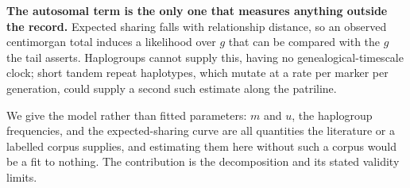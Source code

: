 \documentclass[11pt]{article}
\begin{document}
\noindent\textbf{The autosomal term is the only one that measures anything outside the record.}
Expected sharing falls with relationship distance, so an observed centimorgan total induces a
likelihood over $g$ that can be compared with the $g$ the tail asserts. Haplogroups cannot supply this,
having no genealogical-timescale clock; short tandem repeat haplotypes, which mutate at a rate per
marker per generation, could supply a second such estimate along the patriline.

We give the model rather than fitted parameters: $m$ and $u$, the haplogroup frequencies, and the
expected-sharing curve are all quantities the literature or a labelled corpus supplies, and estimating
them here without such a corpus would be a fit to nothing. The contribution is the decomposition and
its stated validity limits.
\end{document}

